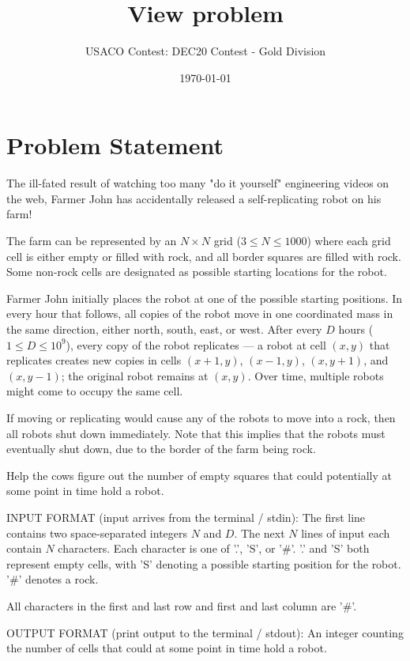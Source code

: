 \documentclass[12pt]{article}
\title{View problem}
\author{USACO Contest: DEC20 Contest - Gold Division}
\date{\today}
\begin{document}
\maketitle

\section*{Problem Statement}

The ill-fated result of watching too many "do it yourself" engineering videos on
the web, Farmer John has accidentally released a self-replicating robot on his
farm! 

The farm can be represented by an $N\times N$ grid ($3\le N\le 1000$) where 
each grid cell is either empty or filled with rock, and all border squares are 
filled with rock.  Some non-rock cells are designated as possible starting 
locations for the robot.

Farmer John initially places the robot at one of the possible starting
positions. In every hour that follows, all copies of the robot move in one
coordinated mass in the same direction, either north, south, east, or west. 
After every $D$ hours ($1 \leq D \leq 10^9$), every copy of the robot replicates
--- a robot at cell $(x,y)$ that replicates creates new copies in cells
$(x+1,y)$, $(x-1,y)$, $(x,y+1)$, and $(x,y-1)$; the original robot remains at
$(x,y)$.  Over time, multiple robots might come to  occupy the same cell.

If moving or replicating would cause any of the robots to move into a rock, then
all robots shut down immediately.  Note that this implies that the robots must
eventually shut down, due to the border of the farm being rock.

Help the cows figure out the number of empty squares that could potentially at
some point in time hold a robot.

INPUT FORMAT (input arrives from the terminal / stdin):
The first line contains two space-separated integers $N$ and $D$. The next $N$ lines of input each contain $N$ characters. Each character is one
of '.', 'S', or '#'. '.' and 'S' both represent empty cells, with 'S' denoting
a possible starting position for the robot. '#' denotes a rock.

All characters in the first and last row and first and last column are '#'.

OUTPUT FORMAT (print output to the terminal / stdout):
An integer counting the number of cells that could at some point in time hold a
robot.
\end{document}

